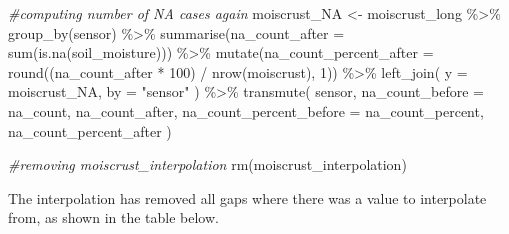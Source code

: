 \documentclass[
  table]{article}
\newenvironment{Shaded}{\begin{snugshade}}{\end{snugshade}}
\newcommand{\AttributeTok}[1]{\textcolor[rgb]{0.77,0.63,0.00}{#1}}
\newcommand{\CommentTok}[1]{\textcolor[rgb]{0.56,0.35,0.01}{\textit{#1}}}
\newcommand{\DecValTok}[1]{\textcolor[rgb]{0.00,0.00,0.81}{#1}}
\newcommand{\FunctionTok}[1]{\textcolor[rgb]{0.00,0.00,0.00}{#1}}
\newcommand{\NormalTok}[1]{#1}
\newcommand{\OtherTok}[1]{\textcolor[rgb]{0.56,0.35,0.01}{#1}}
\newcommand{\SpecialCharTok}[1]{\textcolor[rgb]{0.00,0.00,0.00}{#1}}
\newcommand{\StringTok}[1]{\textcolor[rgb]{0.31,0.60,0.02}{#1}}
\begin{document}
\begin{Shaded}
\begin{Highlighting}[]
\CommentTok{\#computing number of NA cases again}
\NormalTok{moiscrust\_NA }\OtherTok{\textless{}{-}}\NormalTok{ moiscrust\_long }\SpecialCharTok{\%\textgreater{}\%} 
  \FunctionTok{group\_by}\NormalTok{(sensor) }\SpecialCharTok{\%\textgreater{}\%} 
  \FunctionTok{summarise}\NormalTok{(}\AttributeTok{na\_count\_after =} \FunctionTok{sum}\NormalTok{(}\FunctionTok{is.na}\NormalTok{(soil\_moisture))) }\SpecialCharTok{\%\textgreater{}\%} 
  \FunctionTok{mutate}\NormalTok{(}\AttributeTok{na\_count\_percent\_after =} \FunctionTok{round}\NormalTok{((na\_count\_after }\SpecialCharTok{*} \DecValTok{100}\NormalTok{) }\SpecialCharTok{/} \FunctionTok{nrow}\NormalTok{(moiscrust), }\DecValTok{1}\NormalTok{)) }\SpecialCharTok{\%\textgreater{}\%} 
  \FunctionTok{left\_join}\NormalTok{(}
    \AttributeTok{y =}\NormalTok{ moiscrust\_NA,}
    \AttributeTok{by =} \StringTok{"sensor"}
\NormalTok{  ) }\SpecialCharTok{\%\textgreater{}\%} 
  \FunctionTok{transmute}\NormalTok{(}
\NormalTok{    sensor,}
    \AttributeTok{na\_count\_before =}\NormalTok{ na\_count,}
\NormalTok{    na\_count\_after,}
    \AttributeTok{na\_count\_percent\_before =}\NormalTok{ na\_count\_percent,}
\NormalTok{    na\_count\_percent\_after}
\NormalTok{  )}

\CommentTok{\#removing moiscrust\_interpolation}
\FunctionTok{rm}\NormalTok{(moiscrust\_interpolation)}
\end{Highlighting}
\end{Shaded}

The interpolation has removed all gaps where there was a value to
interpolate from, as shown in the table below.
\end{document}
